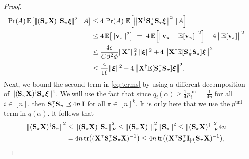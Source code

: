 \documentclass[12pt]{sty/colt2019/colt2018-arxiv}
\begin{document}
\begin{proof}
 \begin{align}
   \Pr(A) \,\E\big[\|(\S_\pi\X)^\dagger\S_\pi\xib\|^2\ |\,A\big]
   &\leq 4\ \Pr(A)\ \E\Big[\big\| \X^\dagger\S_\pi^\top\S_\pi\xib\big\|^2\ |\,A\Big] 
\nonumber \\
   &\leq 4\, \E\big[\|\v_\pi\|^2\big]\ = \ 4\,\E\Big[\big\|\v_\pi-\E[\v_\pi]\big\|^2\Big] + 4\,\big\|\E[\v_\pi]\big\|^2\nonumber  \\
   &\leq \frac{4\epsilon}{C\beta^2\phi}\|\X^\dagger\|_F^2\|\xib\|^2 +
     4\,\big\|
     \X^\dagger\E[\S_\pi^\top\S_\pi]\xib\big\|^2\nonumber \\
     &\leq \frac{\epsilon}{16}\|\xib\|^2+4\,\big\|
     \X^\dagger\E[\S_\pi^\top\S_\pi]\xib\big\|^2. \label{eq term 1}
 \end{align}
 Next, we bound the second term in \eqref{eq:terms} by using a
 different decomposition of $\|(\mathbf{S}_\pi\mathbf X)^\dagger\mathbf{S}_\pi\boldsymbol\xi\|^2$. We will
 use the fact that since $q_i(\alpha)\geq \frac14
 p_i^{\mathrm{uni}}=\frac1{4n}$ for all $i\in[n]$, then
 $\S_\pi^\top\S_\pi\preceq 4n\,\I$ for all $\pi\in[n]^k$. It is only
 here that we use the $p^{\mathrm{uni}}$ term in $q(\alpha)$. It
 follows that
\begin{align*}
 \norm{(\S_\pi\X)^\dagger\S_\pi}^2
 	   & \le \norm{(\S_\pi\X)^\dagger\S_\pi}_F^2
\le  \norm{(\S_\pi\X)^\dagger}_F^2 \norm{\S_\pi}^2
\le  \norm{(\S_\pi\X)^\dagger}_F^2 4n
	\\ & = 4n\,\tr \big((\X^\top\S_\pi^\top \S_\pi \X)^{-1}\big)
\le 4n\, \tr\big((\X^\top\S_{\pi}^\top\I_{[d]}\S_{\pi}\X)^{-1}\big),
\end{align*}

\end{proof}
\end{document}
